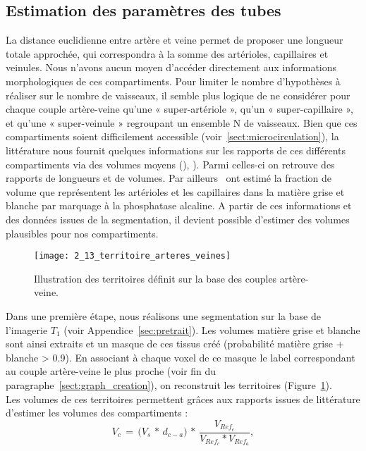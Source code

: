 \subsection{Estimation des paramètres des tubes}
\label{sec:tubesestimates}
La distance euclidienne entre artère et veine permet de proposer une longueur totale approchée, qui correspondra à la somme des artérioles, capillaires et veinules.  Nous n’avons aucun moyen d’accéder directement aux informations morphologiques de ces compartiments. Pour limiter le nombre d’hypothèses à réaliser sur le nombre de vaisseaux, il semble plus logique de ne considérer pour chaque couple artère-veine qu’une « super-artériole », qu’un « super-capillaire », et qu’une « super-veinule » regroupant un ensemble N de vaisseaux. Bien que ces compartiments soient difficilement accessible (voir~\ref{sect:microcirculation}), la littérature nous fournit quelques informations sur les rapports de ces différents compartiments via des volumes moyens (\cite{Zagzoule1986}), \cite{Linninger2009}). Parmi celles-ci on retrouve des rapports de longueurs et de volumes. Par ailleurs~\cite{Moody2004} ont estimé la fraction de volume que représentent les artérioles et les capillaires dans la matière grise et blanche par marquage à la phosphatase alcaline. A partir de ces informations et des données issues de la segmentation, il devient possible d’estimer des volumes plausibles pour nos compartiments.\\	
\begin{figure}[!b]
\centering
\texttt{[image: 2\_13\_territoire\_arteres\_veines]}
\caption{Illustration des territoires définit sur la base des couples artère-veine.}
\label{fig:2_13_territoire_arteres_veines}	
\end{figure}	
Dans une première étape, nous réalisons une segmentation sur la base de l’imagerie $T_1$ (voir Appendice~\ref{sec:pretrait}). Les volumes matière grise et blanche sont ainsi extraits et un masque de ces tissus créé (probabilité matière grise + blanche > 0.9). En associant à chaque voxel de ce masque le label correspondant au couple artère-veine le plus proche (voir fin du paragraphe~\ref{sect:graph_creation}), on reconstruit les territoires (Figure~\ref{fig:2_13_territoire_arteres_veines}). \\
Les volumes de ces territoires permettent grâces aux rapports issues de littérature d’estimer les volumes des compartiments : 
\begin{equation}
\label{eq:volumesac}
V_{c}\,=\,\bigl(V_{s}\, *\,d_{c-a}\bigr)\, *\,\frac{V_{Ref_{c}}}{V_{Ref_{c}}*V_{Ref_{a}}},
\end{equation}
